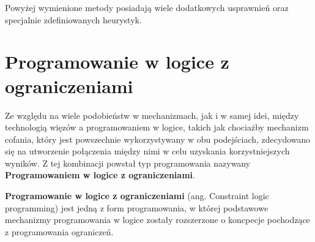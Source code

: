    Powyżej wymienione metody posiadają wiele dodatkowych usprawnień oraz specjalnie zdefiniowanych heurystyk. \cite{CP}
    
\section{Programowanie w logice z ograniczeniami}
    Ze względu na wiele podobieństw w mechanizmach, jak i w samej idei, między technologią więzów a programowaniem w logice, takich jak chociażby mechanizm cofania, który jest 
    powszechnie wykorzystywany w obu podejściach, zdecydowano się na utworzenie połączenia między nimi w celu uzyskania korzystniejszych wyników. Z tej kombinacji powstał 
    typ programowania nazywany \textbf{Programowaniem w logice z ograniczeniami}.
    \begin{definition}
        \textbf{Programowanie w logice z ograniczeniami} (ang. Constraint logic programming) jest jedną z form programowania,
        w której podstawowe mechanizmy programowania w logice zostały rozszerzone o koncpecje pochodzące z programowania ograniczeń.
    \end{definition}

